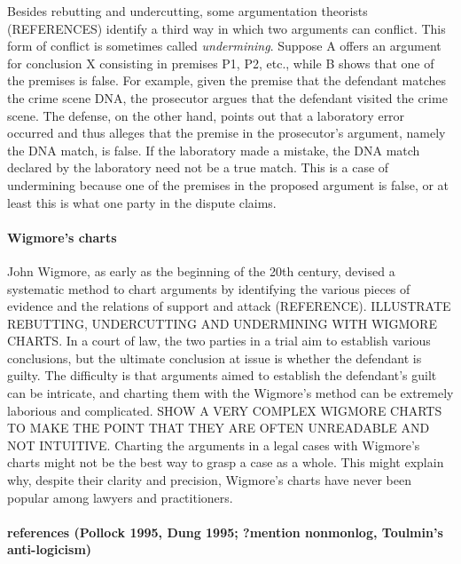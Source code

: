 \documentclass[10pt]{article}
\begin{document}
Besides rebutting and undercutting, some argumentation theorists (REFERENCES) identify a third way in which 
two arguments can conflict. This form of conflict is sometimes called \textit{undermining}.
Suppose A offers an argument for conclusion X consisting in premises P1, P2, etc., 
while B shows that one of the premises is false. For example, given the premise that the defendant 
matches the crime scene DNA, the prosecutor argues 
that the defendant visited the crime scene. The defense, on the other hand, points out that 
a laboratory error occurred and thus alleges that the premise in the prosecutor's 
argument, namely the DNA match, is false. If the laboratory made a mistake, the DNA match declared by the laboratory  need not 
be a true match.  This is a case of undermining because one of the premises 
in the proposed argument is false, or at least this is what one party in the dispute claims.
 
\paragraph{Wigmore's charts} 
John Wigmore, as early as the beginning of the 20th century, devised a systematic method to chart arguments by identifying the
 various pieces of evidence and the relations of support and attack (REFERENCE). ILLUSTRATE REBUTTING, UNDERCUTTING AND UNDERMINING WITH WIGMORE CHARTS.
 In a court of law, the two parties in a trial aim to establish various conclusions, 
but the ultimate conclusion at issue is whether the defendant is guilty.  
The difficulty is that arguments aimed to establish the defendant's guilt can 
be intricate, and charting them with the Wigmore's method
can be extremely laborious and complicated.  SHOW A VERY COMPLEX WIGMORE CHARTS TO MAKE THE POINT THAT THEY 
  ARE OFTEN UNREADABLE AND NOT INTUITIVE. 
 Charting the arguments in a legal cases with Wigmore's charts might not be the best way to grasp a 
case as a whole. This might explain 
why, despite their clarity and precision, Wigmore's charts have 
 never been popular among lawyers and practitioners. 

  
 \paragraph{references (Pollock 1995, Dung 1995; ?mention nonmonlog, Toulmin's anti-logicism)}
\end{document}
